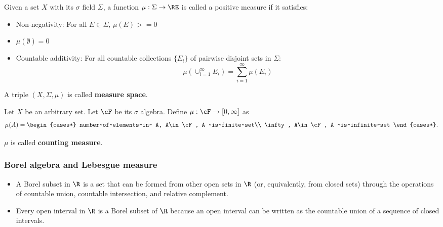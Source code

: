\begin{refsection}
\begin{definition}
\end{definition}




\begin{definition}\cite[7]{cheng2008crash}
	Given a set $X$ with its $\sigma$ field $\Sigma$, a function $\mu: \Sigma \rightarrow \RE$ is called a positive measure if it satisfies:
	\begin{itemize}
		\item Non-negativity: For all $E \in \Sigma$, $\mu(E)>=0$
		\item $\mu(\emptyset) = 0$
		\item Countable additivity: For all countable collections $\{E_i\}$ of pairwise disjoint sets in $\Sigma$:
		$$\mu(\cup_{i=1}^\infty E_i) = \sum_{i=1}^\infty \mu(E_i)$$
	\end{itemize}
A triple $(X,\Sigma,\mu)$ is called \textbf{measure space}.	
\end{definition}

\begin{example}
Let $X$ be an arbitrary set. Let $\cF$ be its $\sigma$ algebra. Define $\mu:\cF\to [0,\infty]$ as
$$\mu(A) = \begin{cases*}
number~of~elements~in~ A, A\in \cF, A ~is~finite~set\\
\infty, A\in \cF, A ~is~infinite~set
\end{cases*}.$$

$\mu$ is called \textbf{counting measure}. 	
\end{example}

\begin{lemma}
	
\end{lemma}



\subsubsection{Borel algebra and Lebesgue measure}





\begin{definition}\cite{wiki:Borelset}\cite[7]{shreve2004stochastic2}\hfill
\begin{itemize}
	\item A Borel subset in $\R$ is a set  that can be formed from other open sets in $\R$ (or, equivalently, from closed sets) through the operations of countable union, countable intersection, and relative complement.
	\item Every open interval in $\R$ is a Borel subset of $\R$ because an open interval can be written as the countable union of a sequence of closed intervals.
	

\end{itemize}
\end{definition}
\end{refsection}
